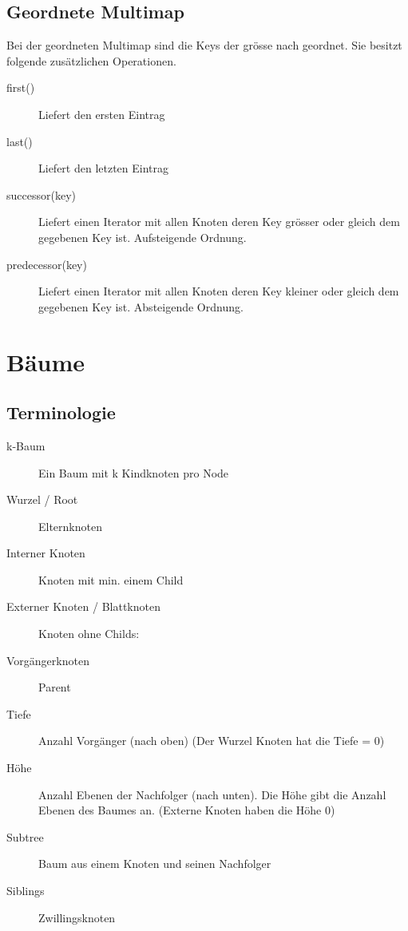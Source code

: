 \subsection{Geordnete Multimap}
Bei der geordneten Multimap sind die Keys der grösse nach geordnet. Sie besitzt folgende zusätzlichen Operationen.
\begin{description}
	\item[first()] Liefert den ersten Eintrag
	\item[last()] Liefert den letzten Eintrag
	\item[successor(key)] Liefert einen Iterator mit allen Knoten deren Key grösser oder gleich dem gegebenen Key ist. Aufsteigende Ordnung.
	\item[predecessor(key)]  Liefert einen Iterator mit allen Knoten deren Key kleiner oder gleich dem gegebenen Key ist. Absteigende Ordnung.
\end{description}

\section{Bäume}
\subsection{Terminologie}
\begin{description}
	\item[k-Baum] Ein Baum mit k Kindknoten pro Node
	\item[Wurzel / Root] Elternknoten
	\item[Interner Knoten] Knoten mit min. einem Child
	\item[Externer Knoten / Blattknoten] Knoten ohne Childs:
	\item[Vorgängerknoten] Parent
	\item[Tiefe] Anzahl Vorgänger (nach oben) (Der Wurzel Knoten hat die Tiefe = 0)
	\item[Höhe] Anzahl Ebenen der Nachfolger (nach unten). Die Höhe gibt die Anzahl Ebenen des Baumes an. (Externe Knoten haben die Höhe 0)
	\item[Subtree] Baum aus einem Knoten und seinen Nachfolger
	\item[Siblings] Zwillingsknoten
\end{description}

